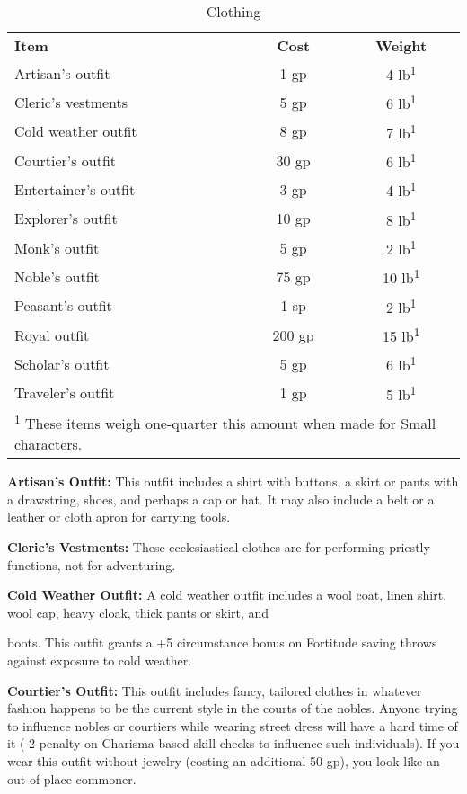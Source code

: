 \begin{table}[htb]
\caption{Clothing}
\centering
\begin{tabular}{l c c}
\textbf{Item} & \textbf{Cost} & \textbf{Weight}\\
Artisan's outfit & 1 gp & 4 lb\textsuperscript{1}\\
Cleric's vestments & 5 gp & 6 lb\textsuperscript{1}\\
Cold weather outfit & 8 gp & 7 lb\textsuperscript{1}\\
Courtier's outfit & 30 gp & 6 lb\textsuperscript{1}\\
Entertainer's outfit & 3 gp & 4 lb\textsuperscript{1}\\
Explorer's outfit & 10 gp & 8 lb\textsuperscript{1}\\
Monk's outfit & 5 gp & 2 lb\textsuperscript{1}\\
Noble's outfit & 75 gp & 10 lb\textsuperscript{1}\\
Peasant's outfit & 1 sp & 2 lb\textsuperscript{1}\\
Royal outfit & 200 gp & 15 lb\textsuperscript{1}\\
Scholar's outfit & 5 gp & 6 lb\textsuperscript{1}\\
Traveler's outfit & 1 gp & 5 lb\textsuperscript{1}\\
\multicolumn{3}{p{6cm}}{\textsuperscript{1} These items weigh one-quarter this amount when made for Small characters.}\\
\end{tabular}
\end{table}

\textbf{Artisan's Outfit:} This outfit includes a shirt with buttons, a skirt or 
pants with a drawstring, shoes, and perhaps a cap or hat. It may also include a 
belt or a leather or cloth apron for carrying tools.

\textbf{Cleric's Vestments:} These ecclesiastical clothes are for performing priestly 
functions, not for adventuring.

\textbf{Cold Weather Outfit:} A cold weather outfit includes a wool coat, linen 
shirt, wool cap, heavy cloak, thick pants or skirt, and

boots. This outfit grants a +5 circumstance bonus on Fortitude saving throws against 
exposure to cold weather.

\textbf{Courtier's Outfit:} This outfit includes fancy, tailored clothes in whatever 
fashion happens to be the current style in the courts of the nobles. Anyone trying 
to influence nobles or courtiers while wearing street dress will have a hard time 
of it (-2 penalty on Charisma-based skill checks to influence such individuals). 
If you wear this outfit without jewelry (costing an additional 50 gp), you look 
like an out-of-place commoner.

